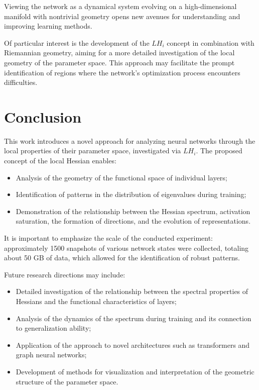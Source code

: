 \documentclass[a4paper,12pt]{article}
\begin{document}
Viewing the network as a dynamical system evolving on a high-dimensional manifold with nontrivial geometry
opens new avenues for understanding and improving learning methods.

Of particular interest is the development of the $LH_i$ concept in combination with Riemannian geometry,
aiming for a more detailed investigation of the local geometry of the parameter space. This approach may
facilitate the prompt identification of regions where the network's optimization process encounters difficulties.

\section{Conclusion}
This work introduces a novel approach for analyzing neural networks through the local properties of their
parameter space, investigated via $LH_i$. The proposed concept of the local Hessian enables:
\begin{itemize}
  \item Analysis of the geometry of the functional space of individual layers;
  \item Identification of patterns in the distribution of eigenvalues during training;
  \item Demonstration of the relationship between the Hessian spectrum, activation saturation, the formation
    of directions, and the evolution of representations.
\end{itemize}

It is important to emphasize the scale of the conducted experiment: approximately 1500 snapshots of various
network states were collected, totaling about 50 GB of data, which allowed for the identification of robust patterns.

Future research directions may include:
\begin{itemize}
  \item Detailed investigation of the relationship between the spectral properties of Hessians and the
    functional characteristics of layers;
  \item Analysis of the dynamics of the spectrum during training and its connection to generalization ability;
  \item Application of the approach to novel architectures such as transformers and graph neural networks;
  \item Development of methods for visualization and interpretation of the geometric structure of the parameter space.
\end{itemize}
\end{document}
